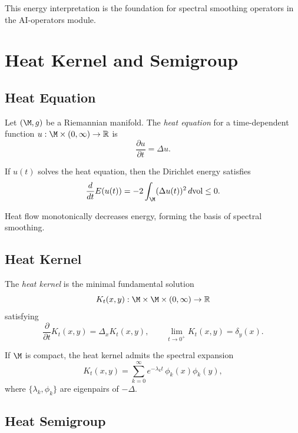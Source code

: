 \begin{remark}
This energy interpretation is the foundation for spectral smoothing
operators in the AI-operators module.
\end{remark}

\section{Heat Kernel and Semigroup}

\subsection{Heat Equation}

\begin{definition}
Let $(\M,g)$ be a Riemannian manifold.  
The \emph{heat equation} for a time-dependent function $u : \M \times (0,\infty) \to \mathbb{R}$ is
\[
\frac{\partial u}{\partial t} = \Delta u.
\]
\end{definition}

\begin{lemma}
If $u(t)$ solves the heat equation, then the Dirichlet energy satisfies
\[
\frac{d}{dt} E(u(t)) = -2 \int_\M (\Delta u(t))^2\, d\mathrm{vol} \le 0.
\]
\end{lemma}

\begin{remark}
Heat flow monotonically decreases energy, forming the basis of spectral smoothing.
\end{remark}

\subsection{Heat Kernel}

\begin{definition}
The \emph{heat kernel} is the minimal fundamental solution
\[
K_t(x,y) : \M \times \M \times (0,\infty) \to \mathbb{R}
\]
satisfying
\[
\frac{\partial}{\partial t} K_t(x,y) = \Delta_x K_t(x,y),
\qquad
\lim_{t \to 0^+} K_t(x,y) = \delta_y(x).
\]
\end{definition}

\begin{lemma}
If $\M$ is compact, the heat kernel admits the spectral expansion
\[
K_t(x,y)
= \sum_{k=0}^\infty e^{-\lambda_k t}\, \phi_k(x)\phi_k(y),
\]
where $\{\lambda_k,\phi_k\}$ are eigenpairs of $-\Delta$.
\end{lemma}

\subsection{Heat Semigroup}

